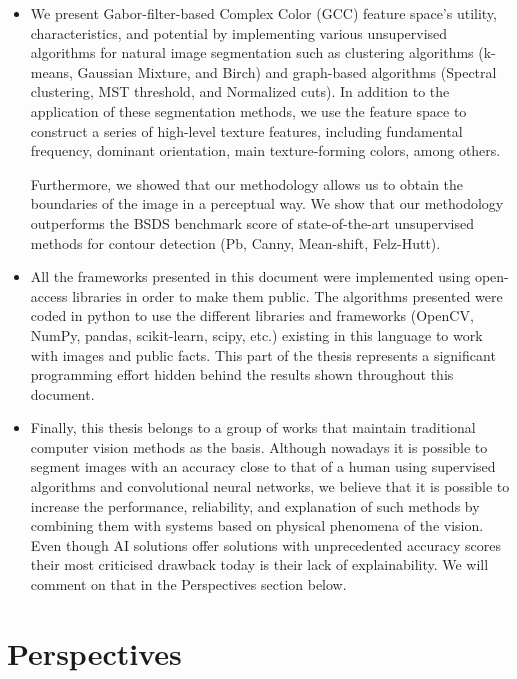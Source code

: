 \begin{itemize}
	\item We present Gabor-filter-based Complex Color (GCC) feature space's utility, characteristics, and potential by implementing various unsupervised algorithms for natural image segmentation such as clustering algorithms (k-means, Gaussian Mixture, and Birch) and graph-based algorithms (Spectral clustering, MST threshold, and Normalized cuts). In addition to the application of these segmentation methods, we use the feature space to construct a series of high-level texture features, including fundamental frequency, dominant orientation, main texture-forming colors, among others. 

Furthermore, we showed that our methodology allows us to obtain the boundaries of the image in a perceptual way. We show that our methodology outperforms the BSDS benchmark score of state-of-the-art unsupervised methods for contour detection (Pb, Canny, Mean-shift, Felz-Hutt).
	
	\item All the frameworks presented in this document were implemented using open-access libraries in order to make them public. The algorithms presented were coded in python to use the different libraries and frameworks (OpenCV, NumPy, pandas, scikit-learn, scipy, etc.) existing in this language to work with images and public facts. This part of the thesis represents a significant programming effort hidden behind the results shown throughout this document.
	
	\item Finally, this thesis belongs to a group of works that maintain traditional computer vision methods as the basis. Although nowadays it is possible to segment images with an accuracy close to that of a human using supervised algorithms and convolutional neural networks, we believe that it is possible to increase the performance, reliability, and explanation of such methods by combining them with systems based on physical phenomena of the vision. Even though AI solutions offer solutions with unprecedented accuracy scores their most criticised drawback today is their lack of explainability. We will comment on that in the Perspectives section below.	
	
\end{itemize}


\section*{Perspectives}

